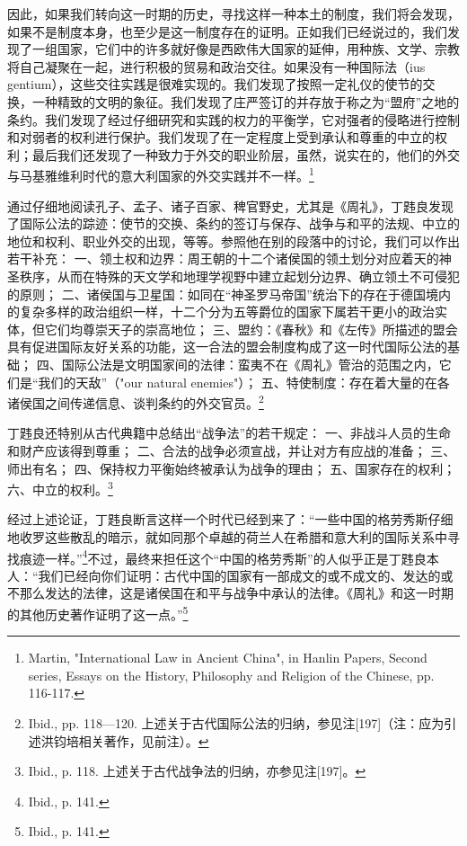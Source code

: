 \documentclass[a4paper, 12pt, openright]{ctexbook}
\renewenvironment{quote}
  {\list{}{\rightmargin2\ccwd \leftmargin2\ccwd \itemindent=2\ccwd \listparindent=2\ccwd}%
   \item\relax\small\kaishu\color{black}}
  {\endlist}
\begin{document}
\begin{quote}
因此，如果我们转向这一时期的历史，寻找这样一种本土的制度，我们将会发现，如果不是制度本身，也至少是这一制度存在的证明。正如我们已经说过的，我们发现了一组国家，它们中的许多就好像是西欧伟大国家的延伸，用种族、文学、宗教将自己凝聚在一起，进行积极的贸易和政治交往。如果没有一种国际法（ius gentium），这些交往实践是很难实现的。我们发现了按照一定礼仪的使节的交换，一种精致的文明的象征。我们发现了庄严签订的并存放于称之为“盟府”之地的条约。我们发现了经过仔细研究和实践的权力的平衡学，它对强者的侵略进行控制和对弱者的权利进行保护。我们发现了在一定程度上受到承认和尊重的中立的权利；最后我们还发现了一种致力于外交的职业阶层，虽然，说实在的，他们的外交与马基雅维利时代的意大利国家的外交实践并不一样。\footnote{Martin, "International Law in Ancient China", in Hanlin Papers, Second series, Essays on the History, Philosophy and Religion of the Chinese, pp. 116-117.}
\end{quote}

通过仔细地阅读孔子、孟子、诸子百家、稗官野史，尤其是《周礼》，丁韪良发现了国际公法的踪迹：使节的交换、条约的签订与保存、战争与和平的法规、中立的地位和权利、职业外交的出现，等等。参照他在别的段落中的讨论，我们可以作出若干补充：
一、领土权和边界：周王朝的十二个诸侯国的领土划分对应着天的神圣秩序，从而在特殊的天文学和地理学视野中建立起划分边界、确立领土不可侵犯的原则；
二、诸侯国与卫星国：如同在“神圣罗马帝国”统治下的存在于德国境内的复杂多样的政治组织一样，十二个分为五等爵位的国家下属若干更小的政治实体，但它们均尊崇天子的崇高地位；
三、盟约：《春秋》和《左传》所描述的盟会具有促进国际友好关系的功能，这一合法的盟会制度构成了这一时代国际公法的基础；
四、国际公法是文明国家间的法律：蛮夷不在《周礼》管治的范围之内，它们是“我们的天敌”（"our natural enemies"）；
五、特使制度：存在着大量的在各诸侯国之间传递信息、谈判条约的外交官员。\footnote{Ibid., pp. 118—120. 上述关于古代国际公法的归纳，参见注[197]（注：应为引述洪钧培相关著作，见前注）。}

丁韪良还特别从古代典籍中总结出“战争法”的若干规定：
一、非战斗人员的生命和财产应该得到尊重；
二、合法的战争必须宣战，并让对方有应战的准备；
三、师出有名；
四、保持权力平衡始终被承认为战争的理由；
五、国家存在的权利；
六、中立的权利。\footnote{Ibid., p. 118. 上述关于古代战争法的归纳，亦参见注[197]。}

经过上述论证，丁韪良断言这样一个时代已经到来了：“一些中国的格劳秀斯仔细地收罗这些散乱的暗示，就如同那个卓越的荷兰人在希腊和意大利的国际关系中寻找痕迹一样。”\footnote{Ibid., p. 141.}不过，最终来担任这个“中国的格劳秀斯”的人似乎正是丁韪良本人：“我们已经向你们证明：古代中国的国家有一部成文的或不成文的、发达的或不那么发达的法律，这是诸侯国在和平与战争中承认的法律。《周礼》和这一时期的其他历史著作证明了这一点。”\footnote{Ibid., p. 141.}
\end{document}
